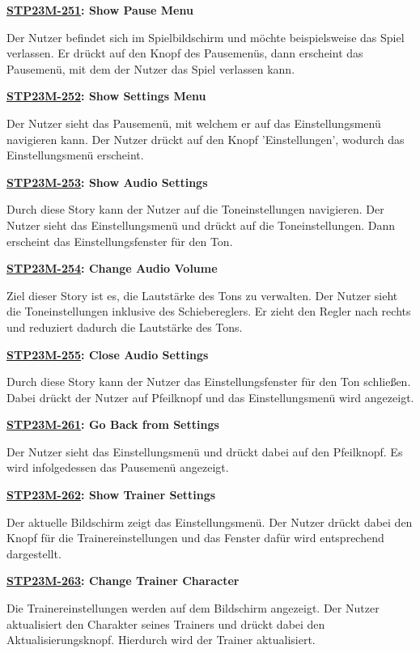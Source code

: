 \textbf{\hyperlink{T251}{\hypertarget{S251}{STP23M-251}}: Show Pause Menu}

Der Nutzer befindet sich im Spielbildschirm und möchte beispielsweise das Spiel verlassen. Er drückt auf den Knopf des Pausemenüs, dann erscheint das Pausemenü, mit dem der Nutzer das Spiel verlassen kann.

\textbf{\hyperlink{T252}{\hypertarget{S252}{STP23M-252}}: Show Settings Menu}

Der Nutzer sieht das Pausemenü, mit welchem er auf das Einstellungsmenü navigieren kann. Der Nutzer drückt auf den Knopf 'Einstellungen', wodurch das Einstellungsmenü erscheint.

\textbf{\hyperlink{T253}{\hypertarget{S253}{STP23M-253}}: Show Audio Settings}

Durch diese Story kann der Nutzer auf die Toneinstellungen navigieren. Der Nutzer sieht das Einstellungsmenü und drückt auf die Toneinstellungen. Dann erscheint das Einstellungsfenster für den Ton.

\textbf{\hyperlink{T254}{\hypertarget{S254}{STP23M-254}}: Change Audio Volume}

Ziel dieser Story ist es, die Lautstärke des Tons zu verwalten. Der Nutzer sieht die Toneinstellungen inklusive des Schiebereglers. Er zieht den Regler nach rechts und reduziert dadurch die Lautstärke des Tons.

\textbf{\hyperlink{T255}{\hypertarget{S255}{STP23M-255}}: Close Audio Settings}

Durch diese Story kann der Nutzer das Einstellungsfenster für den Ton schließen. Dabei drückt der Nutzer auf Pfeilknopf und das Einstellungsmenü wird angezeigt.

\textbf{\hyperlink{T261}{\hypertarget{S261}{STP23M-261}}: Go Back from Settings}

Der Nutzer sieht das Einstellungsmenü und drückt dabei auf den Pfeilknopf. Es wird infolgedessen das Pausemenü angezeigt.

\textbf{\hyperlink{T262}{\hypertarget{S262}{STP23M-262}}: Show Trainer Settings}

Der aktuelle Bildschirm zeigt das Einstellungsmenü. Der Nutzer drückt dabei den Knopf für die Trainereinstellungen und das Fenster dafür wird entsprechend dargestellt.

\textbf{\hyperlink{T263}{\hypertarget{S263}{STP23M-263}}: Change Trainer Character}

Die Trainereinstellungen werden auf dem Bildschirm angezeigt. Der Nutzer aktualisiert den Charakter seines Trainers und drückt dabei den Aktualisierungsknopf. Hierdurch wird der Trainer aktualisiert.

